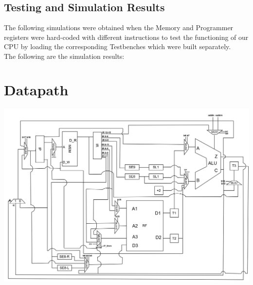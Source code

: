 \documentclass{article}
\begin{document}
\subsection{Testing and Simulation Results}
The following simulations were obtained when the Memory and Programmer registers were hard-coded with different instructions to test the functioning of our CPU by loading the corresponding Testbenches which were built separately.\\ The following are the simulation results:

\newpage
\section{Datapath}
    \begin{raggedleft}
    \includegraphics[width = 0.89\linewidth]
    {Images/iitb_cpu.jpg}
    \end{raggedleft}  
\end{document}
